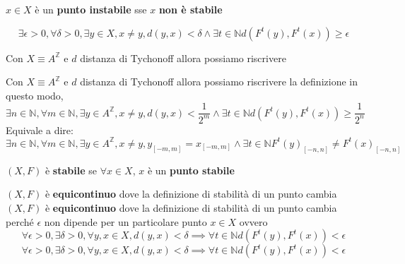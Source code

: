 \begin{definizione} 
    $x\in X$ è un \textbf{punto instabile} sse $x$ \textbf{non è stabile}

    $$\exists \epsilon > 0,\forall \delta > 0, \exists y\in X,x \ne y, d(y,x) < \delta \land \exists t\in \mathbb{N} d(F^t(y),F^t(x))\ge \epsilon$$

    Con $X \equiv A^\mathbb{Z}$ e $d$ distanza di Tychonoff allora possiamo riscrivere

    Con $X \equiv A^\mathbb{Z}$ e $d$ distanza di Tychonoff allora possiamo riscrivere
    la definizione in questo modo,
    $$\exists n\in \mathbb{N} ,\forall m\in \mathbb{N} , \exists y\in A^\mathbb{Z},x \ne y, d(y,x) < \frac{1}{2^m} \land \exists t\in \mathbb{N} d(F^t(y),F^t(x))\ge \frac{1}{2^n}$$
    Equivale a dire:
    $$\exists n\in \mathbb{N} ,\forall m\in \mathbb{N} , \exists y\in A^\mathbb{Z},x \ne y, y_{[-m,m]} = x_{[-m,m]} \land \exists t\in \mathbb{N} F^t(y)_{[-n,n]}\ne F^t(x)_{[-n,n]}$$


\end{definizione}

\begin{definizione} 
    $(X,F)$ è \textbf{stabile} se $\forall x \in X$, $x$ è un \textbf{punto stabile}
\end{definizione}

\begin{definizione} 
    $(X,F)$ è \textbf{equicontinuo} dove la definizione di stabilità di un punto cambia
    $(X,F)$ è \textbf{equicontinuo} dove la definizione di stabilità di un punto cambia
    perché $\epsilon$ non dipende per un particolare punto $x\in X$ ovvero
    $$\forall \epsilon > 0,\exists \delta > 0, \forall y, x\in X, d(y,x) < \delta \implies \forall t\in \mathbb{N} d(F^t(y),F^t(x))< \epsilon$$
    $$\forall \epsilon > 0,\exists \delta > 0, \forall y, x\in X, d(y,x) < \delta \implies \forall t\in \mathbb{N} d(F^t(y),F^t(x))< \epsilon$$
\end{definizione}

